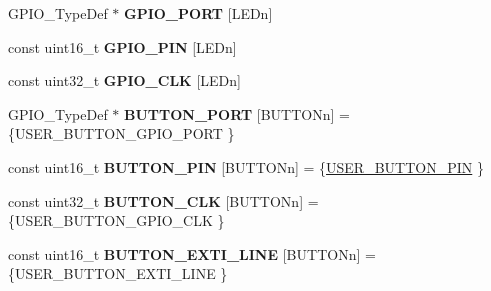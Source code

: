 \begin{DoxyCompactItemize}
\item 
G\-P\-I\-O\-\_\-\-Type\-Def $\ast$ {\bfseries G\-P\-I\-O\-\_\-\-P\-O\-R\-T} \mbox{[}L\-E\-Dn\mbox{]}
\item 
const uint16\-\_\-t {\bfseries G\-P\-I\-O\-\_\-\-P\-I\-N} \mbox{[}L\-E\-Dn\mbox{]}
\item 
const uint32\-\_\-t {\bfseries G\-P\-I\-O\-\_\-\-C\-L\-K} \mbox{[}L\-E\-Dn\mbox{]}
\item 
\hypertarget{group___s_t_m32_f4___d_i_s_c_o_v_e_r_y___l_o_w___l_e_v_e_l___private___variables_gad63ed42b4071e78f80f7462227da4f35}{G\-P\-I\-O\-\_\-\-Type\-Def $\ast$ {\bfseries B\-U\-T\-T\-O\-N\-\_\-\-P\-O\-R\-T} \mbox{[}B\-U\-T\-T\-O\-Nn\mbox{]} = \{U\-S\-E\-R\-\_\-\-B\-U\-T\-T\-O\-N\-\_\-\-G\-P\-I\-O\-\_\-\-P\-O\-R\-T \}}\label{group___s_t_m32_f4___d_i_s_c_o_v_e_r_y___l_o_w___l_e_v_e_l___private___variables_gad63ed42b4071e78f80f7462227da4f35}

\item 
\hypertarget{group___s_t_m32_f4___d_i_s_c_o_v_e_r_y___l_o_w___l_e_v_e_l___private___variables_gadf78f2d71408a01f8d30929c2d2da82b}{const uint16\-\_\-t {\bfseries B\-U\-T\-T\-O\-N\-\_\-\-P\-I\-N} \mbox{[}B\-U\-T\-T\-O\-Nn\mbox{]} = \{\hyperlink{group___s_t_m32_f4___d_i_s_c_o_v_e_r_y___l_o_w___l_e_v_e_l___b_u_t_t_o_n_ga34df6915e3013d6a0c74131d3946b659}{U\-S\-E\-R\-\_\-\-B\-U\-T\-T\-O\-N\-\_\-\-P\-I\-N} \}}\label{group___s_t_m32_f4___d_i_s_c_o_v_e_r_y___l_o_w___l_e_v_e_l___private___variables_gadf78f2d71408a01f8d30929c2d2da82b}

\item 
\hypertarget{group___s_t_m32_f4___d_i_s_c_o_v_e_r_y___l_o_w___l_e_v_e_l___private___variables_gaba532cec9f512c154ac07f1dfa7bfa2f}{const uint32\-\_\-t {\bfseries B\-U\-T\-T\-O\-N\-\_\-\-C\-L\-K} \mbox{[}B\-U\-T\-T\-O\-Nn\mbox{]} = \{U\-S\-E\-R\-\_\-\-B\-U\-T\-T\-O\-N\-\_\-\-G\-P\-I\-O\-\_\-\-C\-L\-K \}}\label{group___s_t_m32_f4___d_i_s_c_o_v_e_r_y___l_o_w___l_e_v_e_l___private___variables_gaba532cec9f512c154ac07f1dfa7bfa2f}

\item 
\hypertarget{group___s_t_m32_f4___d_i_s_c_o_v_e_r_y___l_o_w___l_e_v_e_l___private___variables_ga1760a56d44de70153c4c1a8c785d583b}{const uint16\-\_\-t {\bfseries B\-U\-T\-T\-O\-N\-\_\-\-E\-X\-T\-I\-\_\-\-L\-I\-N\-E} \mbox{[}B\-U\-T\-T\-O\-Nn\mbox{]} = \{U\-S\-E\-R\-\_\-\-B\-U\-T\-T\-O\-N\-\_\-\-E\-X\-T\-I\-\_\-\-L\-I\-N\-E \}}\label{group___s_t_m32_f4___d_i_s_c_o_v_e_r_y___l_o_w___l_e_v_e_l___private___variables_ga1760a56d44de70153c4c1a8c785d583b}


\end{DoxyCompactItemize}
